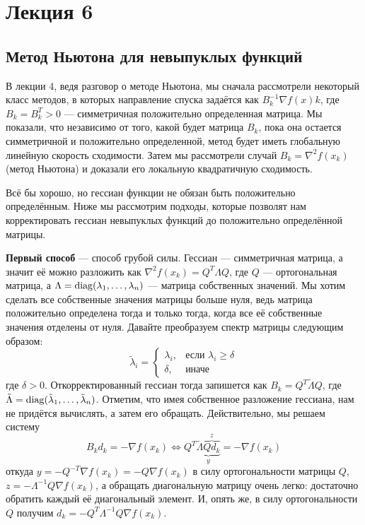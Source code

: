\documentclass[a4paper, 12pt]{article}
\begin{document}
\section{Лекция 6}

\subsection{Метод Ньютона для невыпуклых функций}
В лекции 4, ведя разговор о методе Ньютона, мы сначала рассмотрели некоторый класс методов, в которых направление спуска задаётся как $B_k^{-1}\nabla f(x)k$, где $B_k = B_k^T > 0$ --- симметричная положительно определенная матрица. Мы показали, что независимо от того, какой будет матрица $B_k$, пока она остается симметричной и положительно определенной, метод будет иметь глобальную линейную скорость сходимости. Затем мы рассмотрели случай $B_k = \nabla^2 f(x_k)$ (метод Ньютона) и доказали его локальную квадратичную сходимость.

Всё бы хорошо, но гессиан функции не обязан быть положительно определённым. Ниже мы рассмотрим подходы, которые позволят нам корректировать гессиан невыпуклых функций до положительно определённой матрицы.

\textbf{Первый способ} --- способ грубой силы. Гессиан --- симметричная матрица, а значит её можно разложить как $\nabla^2 f(x_k) = Q^T\Lambda Q$, где $Q$ --- ортогональная матрица, а $\Lambda = \mathrm{diag}(\lambda_1, \dots, \lambda_n)$ --- матрица собственных значений. Мы хотим сделать все собственные значения матрицы больше нуля, ведь матрица положительно определена тогда и только тогда, когда все её собственные значения отделены от нуля. Давайте преобразуем спектр матрицы следующим образом:
$$
\tilde{\lambda}_i = \begin{cases}
    \lambda_i,&\text{если } \lambda_i \geq \delta \\
    \delta,&\text{иначе}
\end{cases}
$$
где $\delta > 0$. Откорректированный гессиан тогда запишется как $B_k = Q^T\tilde{\Lambda}Q$, где $\tilde{\Lambda} = \mathrm{diag}({\tilde{\lambda}_1, \dots, \tilde{\lambda}_n})$. Отметим, что имея собственное разложение гессиана, нам не придётся вычислять, а затем его обращать. Действительно, мы решаем систему $$B_kd_k = -\nabla f(x_k) \Leftrightarrow  Q^T\underbrace{\tilde{\Lambda}\overbrace{Qd_k}^{z}}_{y} = -\nabla f(x_k)$$
откуда $y = -Q^{-T}\nabla f(x_k) = -Q\nabla f(x_k)$ в силу ортогональности матрицы $Q$, $z = -\Lambda^{-1}Q\nabla f(x_k)$, а обращать диагональную матрицу очень легко: достаточно обратить каждый её диагональный элемент. И, опять же, в силу ортогональности $Q$ получим $d_k = -Q^T\Lambda^{-1}Q\nabla f(x_k)$.
\end{document}
